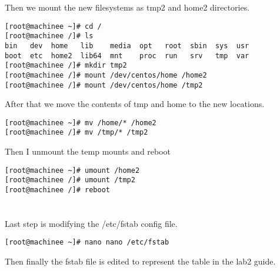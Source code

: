 \documentclass[11pt,onside]{article}
\begin{document}
Then we mount the new filesystems as tmp2 and home2 directories.
\begin{lstlisting}
[root@machinee ~]# cd /
[root@machinee /]# ls
bin   dev  home   lib    media  opt   root  sbin  sys  usr
boot  etc  home2  lib64  mnt    proc  run   srv   tmp  var
[root@machinee /]# mkdir tmp2
[root@machinee /]# mount /dev/centos/home /home2
[root@machinee /]# mount /dev/centos/home /tmp2
\end{lstlisting}
After that we move the contents of tmp and home to the new locations.
\begin{lstlisting}
[root@machinee ~]# mv /home/* /home2 
[root@machinee /]# mv /tmp/* /tmp2 
\end{lstlisting}
Then I unmount the temp mounts and reboot
\begin{lstlisting}
[root@machinee ~]# umount /home2
[root@machinee /]# umount /tmp2
[root@machinee /]# reboot
\end{lstlisting}
\section{}
Last step is modifying the /etc/fstab config file.
\begin{lstlisting}
[root@machinee ~]# nano nano /etc/fstab
\end{lstlisting}
Then finally the fstab file is edited to represent the table in the lab2 guide.
\end{document}
